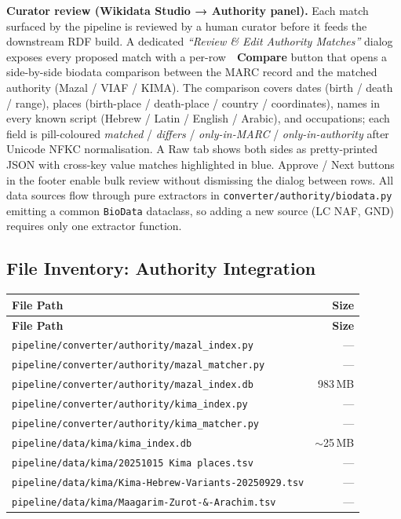 \documentclass[12pt]{article}
\newcommand{\filepath}[1]{\texttt{\small #1}}
\newcommand{\code}[1]{\texttt{#1}}
\begin{document}
\textbf{Curator review (Wikidata Studio → Authority panel).} Each match surfaced by the pipeline is reviewed by a human curator before it feeds the downstream RDF build. A dedicated \emph{``Review \& Edit Authority Matches''} dialog exposes every proposed match with a per-row \textbf{🧬 Compare} button that opens a side-by-side biodata comparison between the MARC record and the matched authority (Mazal / VIAF / KIMA). The comparison covers dates (birth / death / range), places (birth-place / death-place / country / coordinates), names in every known script (Hebrew / Latin / English / Arabic), and occupations; each field is pill-coloured \emph{matched} / \emph{differs} / \emph{only-in-MARC} / \emph{only-in-authority} after Unicode NFKC normalisation. A Raw tab shows both sides as pretty-printed JSON with cross-key value matches highlighted in blue. Approve / Next buttons in the footer enable bulk review without dismissing the dialog between rows. All data sources flow through pure extractors in \code{converter/authority/biodata.py} emitting a common \code{BioData} dataclass, so adding a new source (LC NAF, GND) requires only one extractor function.

\subsection{File Inventory: Authority Integration}

\begin{longtable}{|p{10cm}|r|}
\hline
\textbf{File Path} & \textbf{Size} \\
\hline
\endfirsthead
\hline
\textbf{File Path} & \textbf{Size} \\
\hline
\endhead
\hline
\endfoot
\filepath{pipeline/converter/authority/mazal\_index.py} & --- \\
\hline
\filepath{pipeline/converter/authority/mazal\_matcher.py} & --- \\
\hline
\filepath{pipeline/converter/authority/mazal\_index.db} & 983\,MB \\
\hline
\filepath{pipeline/converter/authority/kima\_index.py} & --- \\
\hline
\filepath{pipeline/converter/authority/kima\_matcher.py} & --- \\
\hline
\filepath{pipeline/data/kima/kima\_index.db} & $\sim$25\,MB \\
\hline
\filepath{pipeline/data/kima/20251015 Kima places.tsv} & --- \\
\hline
\filepath{pipeline/data/kima/Kima-Hebrew-Variants-20250929.tsv} & --- \\
\hline
\filepath{pipeline/data/kima/Maagarim-Zurot-\&-Arachim.tsv} & --- \\
\hline
\end{longtable}
\end{document}
